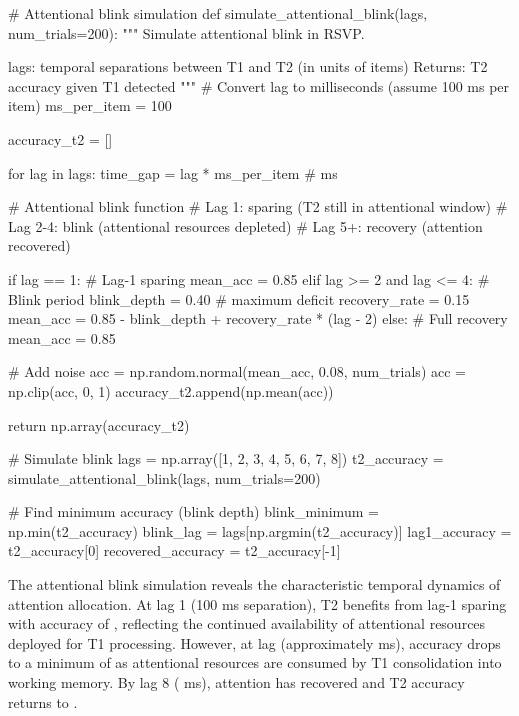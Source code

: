\documentclass[a4paper, 11pt]{article}
\begin{document}
\begin{pycode}
# Attentional blink simulation
def simulate_attentional_blink(lags, num_trials=200):
    """
    Simulate attentional blink in RSVP.

    lags: temporal separations between T1 and T2 (in units of items)
    Returns: T2 accuracy given T1 detected
    """
    # Convert lag to milliseconds (assume 100 ms per item)
    ms_per_item = 100

    accuracy_t2 = []

    for lag in lags:
        time_gap = lag * ms_per_item  # ms

        # Attentional blink function
        # Lag 1: sparing (T2 still in attentional window)
        # Lag 2-4: blink (attentional resources depleted)
        # Lag 5+: recovery (attention recovered)

        if lag == 1:
            # Lag-1 sparing
            mean_acc = 0.85
        elif lag >= 2 and lag <= 4:
            # Blink period
            blink_depth = 0.40  # maximum deficit
            recovery_rate = 0.15
            mean_acc = 0.85 - blink_depth + recovery_rate * (lag - 2)
        else:
            # Full recovery
            mean_acc = 0.85

        # Add noise
        acc = np.random.normal(mean_acc, 0.08, num_trials)
        acc = np.clip(acc, 0, 1)
        accuracy_t2.append(np.mean(acc))

    return np.array(accuracy_t2)

# Simulate blink
lags = np.array([1, 2, 3, 4, 5, 6, 7, 8])
t2_accuracy = simulate_attentional_blink(lags, num_trials=200)

# Find minimum accuracy (blink depth)
blink_minimum = np.min(t2_accuracy)
blink_lag = lags[np.argmin(t2_accuracy)]
lag1_accuracy = t2_accuracy[0]
recovered_accuracy = t2_accuracy[-1]
\end{pycode}

The attentional blink simulation reveals the characteristic temporal dynamics of attention allocation. At lag 1 (100 ms separation), T2 benefits from lag-1 sparing with accuracy of , reflecting the continued availability of attentional resources deployed for T1 processing. However, at lag  (approximately  ms), accuracy drops to a minimum of  as attentional resources are consumed by T1 consolidation into working memory. By lag 8 ( ms), attention has recovered and T2 accuracy returns to .
\end{document}
